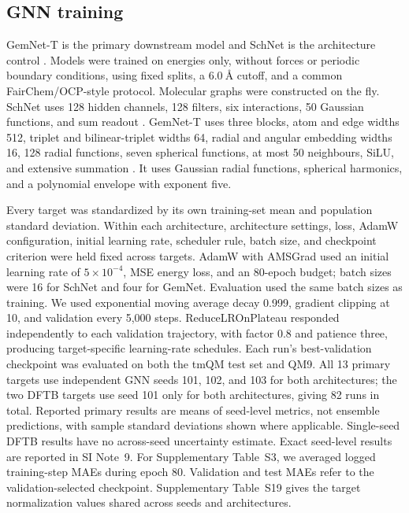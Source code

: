 \subsection{GNN training}
\label{sec:methods-gnn-training}

GemNet-T is the primary downstream model and SchNet is the architecture control \cite{gasteiger2021gemnet,schutt2023schnetpack2}. Models were trained on energies only, without forces or periodic boundary conditions, using fixed splits, a \(6.0~\text{\AA}\) cutoff, and a common FairChem/OCP-style protocol. Molecular graphs were constructed on the fly. SchNet uses 128 hidden channels, 128 filters, six interactions, 50 Gaussian functions, and sum readout \cite{schutt2023schnetpack2}. GemNet-T uses three blocks, atom and edge widths 512, triplet and bilinear-triplet widths 64, radial and angular embedding widths 16, 128 radial functions, seven spherical functions, at most 50 neighbours, SiLU, and extensive summation \cite{gasteiger2021gemnet}. It uses Gaussian radial functions, spherical harmonics, and a polynomial envelope with exponent five.

Every target was standardized by its own training-set mean and population standard deviation. Within each architecture, architecture settings, loss, AdamW configuration, initial learning rate, scheduler rule, batch size, and checkpoint criterion were held fixed across targets. AdamW with AMSGrad used an initial learning rate of \(5\times10^{-4}\), MSE energy loss, and an 80-epoch budget; batch sizes were 16 for SchNet and four for GemNet. Evaluation used the same batch sizes as training. We used exponential moving average decay 0.999, gradient clipping at 10, and validation every 5,000 steps. ReduceLROnPlateau responded independently to each validation trajectory, with factor 0.8 and patience three, producing target-specific learning-rate schedules. Each run's best-validation checkpoint was evaluated on both the tmQM test set and QM9. All 13 primary targets use independent GNN seeds 101, 102, and 103 for both architectures; the two DFTB targets use seed 101 only for both architectures, giving 82 runs in total. Reported primary results are means of seed-level metrics, not ensemble predictions, with sample standard deviations shown where applicable. Single-seed DFTB results have no across-seed uncertainty estimate. Exact seed-level results are reported in SI Note~9. For Supplementary Table~S3, we averaged logged training-step MAEs during epoch 80. Validation and test MAEs refer to the validation-selected checkpoint. Supplementary Table~S19 gives the target normalization values shared across seeds and architectures.

